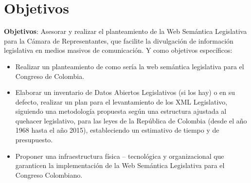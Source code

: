\documentclass[conference]{IEEEtran}\usepackage[]{graphicx}\usepackage[]{color}
\begin{document}
	

\section{Objetivos}
\textbf{Objetivos}: Asesorar y realizar el planteamiento  de la Web Semántica Legislativa para la Cámara de Representantes, que facilite la divulgación de información legislativa en medios masivos de comunicación. Y como objetivos específicos:%
\begin{itemize}
	\item Realizar un planteamiento de como sería la web semántica legislativa para el Congreso de Colombia.%
	\item Elaborar un inventario de Datos Abiertos Legislativos (si los hay) o en su defecto, realizar un plan para el levantamiento de los XML Legislativo, siguiendo una metodología propuesta según una estructura ajustada al quehacer legislativo, para las leyes de la República de Colombia (desde el año 1968 hasta el año 2015), estableciendo un estimativo de tiempo y de presupuesto.%
	\item Proponer una infraestructura física – tecnológica y organizacional que garanticen la implementación de la Web Semántica Legislativa para el Congreso Colombiano.%
\end{itemize}


\end{document}
